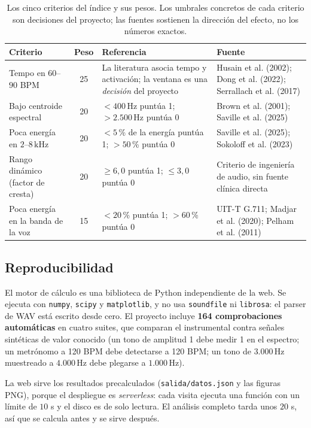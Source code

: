 \documentclass[11pt,a4paper]{article}
\newcommand{\Hz}{\,\mathrm{Hz}}
\newcommand{\kHz}{\,\mathrm{kHz}}
\begin{document}
\begin{table}[H]
\centering
\small
\begin{tabularx}{\linewidth}{@{}>{\raggedright\arraybackslash}p{3.6cm} c >{\raggedright\arraybackslash}X >{\raggedright\arraybackslash}p{3.6cm}@{}}
\toprule
\textbf{Criterio} & \textbf{Peso} & \textbf{Referencia} & \textbf{Fuente} \\
\midrule
Tempo en \(60\)--\(90\) BPM & 25 &
La literatura asocia tempo y activación; la ventana es una \emph{decisión} del
proyecto & Husain et al. (2002); Dong et al. (2022); Serrallach et al. (2017) \\
Bajo centroide espectral & 20 &
\(<400\Hz\) puntúa 1; \(>2.500\Hz\) puntúa 0 & Brown et al. (2001); Saville
et al. (2025) \\
Poca energía en \(2\)--\(8\kHz\) & 20 &
\(<5\)\,\% de la energía puntúa 1; \(>50\)\,\% puntúa 0 & Saville et al.
(2025); Sokoloff et al. (2023) \\
Rango dinámico (factor de cresta) & 20 &
\(\ge6{,}0\) puntúa 1; \(\le3{,}0\) puntúa 0 & Criterio de ingeniería de audio,
sin fuente clínica directa \\
Poca energía en la banda de la voz & 15 &
\(<20\)\,\% puntúa 1; \(>60\)\,\% puntúa 0 & UIT-T G.711; Madjar et al.
(2020); Pelham et al. (2011) \\
\bottomrule
\end{tabularx}
\caption{Los cinco criterios del índice y sus pesos. Los umbrales concretos de
cada criterio son decisiones del proyecto; las fuentes sostienen la dirección
del efecto, no los números exactos.}
\label{tab:criterios}
\end{table}

\subsection{Reproducibilidad}

El motor de cálculo es una biblioteca de Python independiente de la web. Se
ejecuta con \texttt{numpy}, \texttt{scipy} y \texttt{matplotlib}, y no usa
\texttt{soundfile} ni \texttt{librosa}: el parser de WAV está escrito desde
cero. El proyecto incluye \textbf{164 comprobaciones automáticas} en cuatro
suites, que comparan el instrumental contra señales sintéticas de valor
conocido (un tono de amplitud 1 debe medir 1 en el espectro; un metrónomo a
120 BPM debe detectarse a 120 BPM; un tono de \(3.000\Hz\) muestreado a
\(4.000\Hz\) debe plegarse a \(1.000\Hz\)).

La web sirve los resultados precalculados (\texttt{salida/datos.json} y las
figuras PNG), porque el despliegue es \emph{serverless}: cada visita ejecuta
una función con un límite de \(10\) s y el disco es de solo lectura. El análisis
completo tarda unos \(20\) s, así que se calcula antes y se sirve después.
\end{document}
